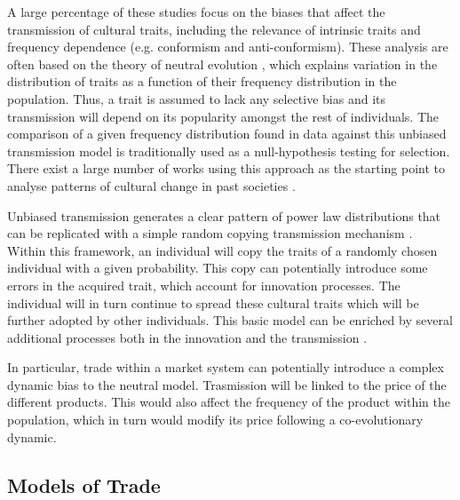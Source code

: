 \documentclass{wscpaperproc}
\begin{document}
A large percentage of these studies focus on the biases that affect the transmission of cultural traits, including the relevance of intrinsic traits and frequency dependence (e.g. conformism and anti-conformism). 
These analysis are often based on the theory of neutral evolution \cite{neiman_stylistic_1995}, which explains variation in the distribution of traits as a function of their frequency distribution in the population. Thus, a trait is assumed to lack any selective bias and its transmission will depend on its popularity amongst the rest of individuals. The comparison of a given frequency distribution found in data against this unbiased transmission model is traditionally used as a null-hypothesis testing for selection. There exist a large number of works using this approach as the starting point to analyse patterns of cultural change in past societies \cite{lipo_neutralitystyle_2001,shennan_ceramic_2001,steele_ceramic_2010,kandler_nonequilibrium_2013,porcic_exploring_2014,crema_approximate_2014}.

Unbiased transmission generates a clear pattern of power law distributions that can be replicated with a simple random copying transmission mechanism \cite{bentley_random_2004}. Within this framework, an individual will copy the traits of a randomly chosen individual with a given probability. This copy can potentially introduce some errors in the acquired trait, which account for innovation processes. The individual will in turn continue to spread these cultural traits which will be further adopted by other individuals. This basic model can be enriched by several additional processes both in the innovation \cite{schillinger_copying_2014,sole_evolutionary_2013,ziman_technological_2003} and the transmission \cite{heyes_social_1994,henrich_evolution_2003}.

In particular, trade within a market system can potentially introduce a complex dynamic bias to the neutral model. Trasmission will be linked to the price of the different products. This would also affect the frequency of the product within the population, which in turn would modify its price following a co-evolutionary dynamic.

\subsection{Models of Trade}

\end{document}
